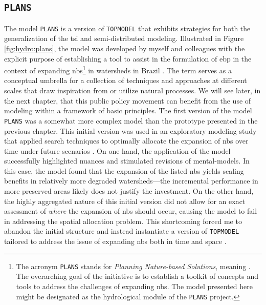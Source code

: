 \documentclass[./main_en.tex]{subfiles}
\begin{document}
\subsection{\texttt{PLANS}} \label{sec:hydro:plans}

\par The \gls{model} \texttt{PLANS} is a version of \texttt{TOPMODEL} that exhibits strategies for both the generalization of the \gls{tsi} and semi-distributed modeling. Illustrated in Figure \ref{fig:hydro:plans}, the \gls{model} was developed by myself and colleagues with the explicit purpose of establishing a tool to assist in the formulation of \gls{ebp} in the context of expanding \acrfull{nbs}\footnote{The acronym \texttt{PLANS} stands for \textit{Planning Nature-based Solutions}, meaning . The overarching goal of the initiative is to establish a toolkit of concepts and tools to address the challenges of expanding \acrshort{nbs}. The \gls{model} presented here might be designated as the hydrological module of the \texttt{PLANS} project.} in watersheds in Brazil \cite{Possantti2022a, Possantti2023a}. The term  serves as a conceptual umbrella for a collection of techniques and approaches at different scales that draw inspiration from or utilize natural processes. We will see later, in the next chapter, that this public policy movement can benefit from the use of modeling within a framework of basic principles. The first version of the \gls{model} \texttt{PLANS} was a somewhat more complex \gls{model} than the prototype presented in the previous chapter. This initial version was used in an exploratory modeling study that applied search techniques to optimally allocate the expansion of \acrshort{nbs} over time under future scenarios \cite{Possantti2022a}. On one hand, the application of the \gls{model} successfully highlighted nuances and stimulated revisions of \gls{mental-models}. In this case, the \gls{model} found that the expansion of the listed \acrshort{nbs} yields scaling benefits in relatively more degraded watersheds—the incremental performance in more preserved areas likely does not justify the investment. On the other hand, the highly aggregated nature of this initial version did not allow for an exact assessment of \textit{where} the expansion of \acrshort{nbs} should occur, causing the \gls{model} to fail in addressing the spatial allocation problem. This shortcoming forced me to abandon the initial structure and instead instantiate a version of \texttt{TOPMODEL} tailored to address the issue of expanding \acrshort{nbs} both in time and space \cite{Possantti2023a}.
\end{document}
